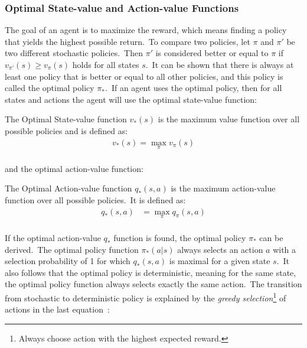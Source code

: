 \documentclass[../xlapes02]{subfiles}
\begin{document}
    \subsubsection{Optimal State-value and Action-value Functions}\label{subsubsec:optimal-value-functions}
    The goal of an agent is to maximize the reward, which means finding a policy that yields the highest possible return.\ To compare two policies, let $\pi$ and $\pi'$ be two different stochastic policies.\ Then $\pi'$ is considered better or equal to $\pi$ if $v_{\pi'}(s) \geq v_{\pi}(s)$ holds for all states $s$.\ It can be shown that there is always at least one policy that is better or equal to all other policies, and this policy is called the optimal policy $\pi_*$.\ If an agent uses the optimal policy, then for all states and actions the agent will use the optimal state-value function:
    \begin{definition}
        The Optimal State-value function $v_*(s)$ is the maximum value function over all possible policies and is defined as:
        \begin{equation}
            \label{eq:Vstar}
            \begin{split}
                v_*(s)=\max_{\pi}v_{\pi}(s)\\
            \end{split}
        \end{equation}
    \end{definition}
    and the optimal action-value function:
    \begin{definition}
        The Optimal Action-value function $q_*(s, a)$ is the maximum action-value function over all possible policies.\ It is defined as:
        \begin{equation}
            \label{eq:Qstar}
            \begin{split}
                q_*(s,a)&=\max_{\pi}q_{\pi}(s,a)\\
            \end{split}
        \end{equation}
    \end{definition}

    If the optimal action-value $q_*$ function is found, the optimal policy $\pi_*$ can be derived.\ The optimal policy function $\pi_*(a|s)$ always selects an action $a$ with a selection probability of 1 for which $q_*(s, a)$ is maximal for a given state $s$.\ It also follows that the optimal policy is deterministic, meaning for the same state, the optimal policy function always selects exactly the same action.\ The transition from stochastic to deterministic policy is explained by the \emph{greedy selection}\footnote{Always choose action with the highest expected reward.} of actions in the last equation~\cite{adamczyk2023bounding, rao2022foundations}:
\end{document}
